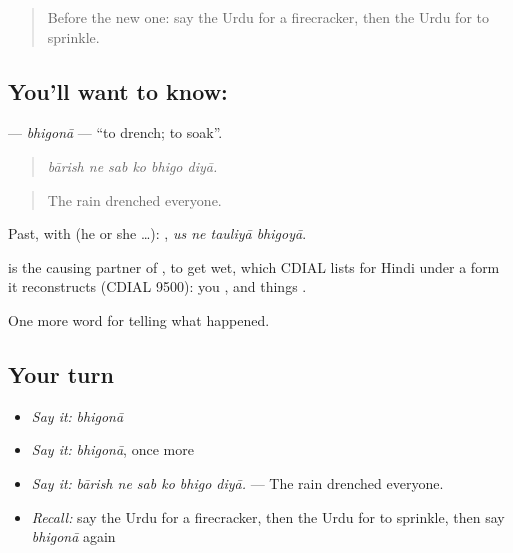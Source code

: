 \label{lesson:UR-C320-bhigona}



\begin{quote}
Before the new one: say the Urdu for a firecracker, then the Urdu for to sprinkle.
\end{quote}

\subsection*{You'll want to know: }
\textbf{} — \emph{bhigonā} — \textquotedblleft{}to drench; to soak\textquotedblright{}.

\begin{quote}
     
\end{quote}

\begin{quote}
\emph{bārish ne sab ko bhigo diyā.}
\end{quote}

\begin{quote}
The rain drenched everyone.
\end{quote}

Past, with  (he or she …):    , \emph{us ne tauliyā bhigoyā}.

\begin{cousinweb}
is the causing partner of \textbf{}, to get wet, which CDIAL lists for Hindi under a form it reconstructs (CDIAL 9500): you \textbf{}, and things \textbf{}.
\end{cousinweb}

\begin{grammarlens}[title={What you've built}]
One more word for telling what happened.
\end{grammarlens}

\subsection*{Your turn}
\begin{itemize}
\raggedright
  \item \emph{Say it:} \emph{bhigonā}
  \item \emph{Say it:} \emph{bhigonā}, once more
  \item \emph{Say it:} \emph{bārish ne sab ko bhigo diyā.} — The rain drenched everyone.
  \item \emph{Recall:} say the Urdu for a firecracker, then the Urdu for to sprinkle, then say \emph{bhigonā} again
\end{itemize}

